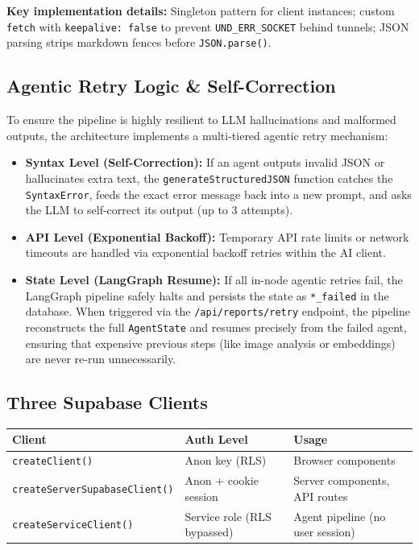 \documentclass[11pt,a4paper]{article}
\newcommand{\thead}[1]{{\color{white}\bfseries\sffamily #1}}
\newcommand{\tech}[1]{\texttt{\color{cpteal}#1}}
\newcommand{\file}[1]{\texttt{\footnotesize\color{cpgray}#1}}
\begin{document}
\textbf{Key implementation details:} Singleton pattern for client instances; custom \tech{fetch} with \tech{keepalive: false} to prevent \tech{UND\_ERR\_SOCKET} behind tunnels; JSON parsing strips markdown fences before \tech{JSON.parse()}.

\subsection{Agentic Retry Logic \& Self-Correction}
To ensure the pipeline is highly resilient to LLM hallucinations and malformed outputs, the architecture implements a multi-tiered agentic retry mechanism:
\begin{itemize}
  \item \textbf{Syntax Level (Self-Correction):} If an agent outputs invalid JSON or hallucinates extra text, the \tech{generateStructuredJSON} function catches the \tech{SyntaxError}, feeds the exact error message back into a new prompt, and asks the LLM to self-correct its output (up to 3 attempts).
  \item \textbf{API Level (Exponential Backoff):} Temporary API rate limits or network timeouts are handled via exponential backoff retries within the AI client.
  \item \textbf{State Level (LangGraph Resume):} If all in-node agentic retries fail, the LangGraph pipeline safely halts and persists the state as \tech{*\_failed} in the database. When triggered via the \file{/api/reports/retry} endpoint, the pipeline reconstructs the full \tech{AgentState} and resumes precisely from the failed agent, ensuring that expensive previous steps (like image analysis or embeddings) are never re-run unnecessarily.
\end{itemize}

\subsection{Three Supabase Clients}

\begin{tabular}{@{} L{4.5cm} L{4cm} L{5.5cm} @{}}
\toprule
{}
\thead{Client} & \thead{Auth Level} & \thead{Usage} \\
\midrule
\tech{createClient()} & Anon key (RLS) & Browser components \\
\tech{createServerSupabaseClient()} & Anon + cookie session & Server components, API routes \\
\tech{createServiceClient()} & Service role (RLS bypassed) & Agent pipeline (no user session) \\
\bottomrule
\end{tabular}
\end{document}

